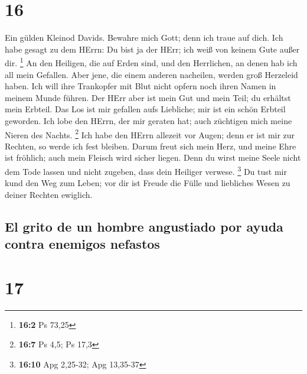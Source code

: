 \hypertarget{section-15}{%
\section{16}\label{section-15}}

 Ein gülden Kleinod Davids. Bewahre mich Gott; denn ich
traue auf dich.  Ich habe gesagt zu dem HErrn: Du bist ja
der HErr; ich weiß von keinem Gute außer dir. \footnote{\textbf{16:2} Ps
  73,25}  An den Heiligen, die auf Erden sind, und den
Herrlichen, an denen hab ich all mein Gefallen.  Aber
jene, die einem anderen nacheilen, werden groß Herzeleid haben. Ich will
ihre Trankopfer mit Blut nicht opfern noch ihren Namen in meinem Munde
führen.  Der HErr aber ist mein Gut und mein Teil; du
erhältst mein Erbteil.  Das Los ist mir gefallen aufs
Liebliche; mir ist ein schön Erbteil geworden.  Ich lobe
den HErrn, der mir geraten hat; auch züchtigen mich meine Nieren des
Nachts. \footnote{\textbf{16:7} Ps 4,5; Ps 17,3}  Ich habe
den HErrn allezeit vor Augen; denn er ist mir zur Rechten, so werde ich
fest bleiben.  Darum freut sich mein Herz, und meine Ehre
ist fröhlich; auch mein Fleisch wird sicher liegen.  Denn
du wirst meine Seele nicht dem Tode lassen und nicht zugeben, dass dein
Heiliger verwese. \footnote{\textbf{16:10} Apg 2,25-32; Apg 13,35-37}
 Du tust mir kund den Weg zum Leben; vor dir ist Freude
die Fülle und liebliches Wesen zu deiner Rechten ewiglich.

\hypertarget{el-grito-de-un-hombre-angustiado-por-ayuda-contra-enemigos-nefastos}{%
\subsection{El grito de un hombre angustiado por ayuda contra enemigos
nefastos}\label{el-grito-de-un-hombre-angustiado-por-ayuda-contra-enemigos-nefastos}}

\hypertarget{section-16}{%
\section{17}\label{section-16}}

